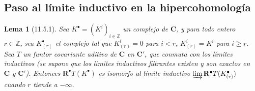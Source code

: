 \documentclass[10pt,oneside,openany]{book}
\theoremstyle{egaenv}\newtheorem*{env}{---}
\theoremstyle{egastatement}
\newtheorem*{lemma}{Lema}
\theoremstyle{egadescription}
\newcommand{\oldpage}[2][]{\marginnote{\normalfont\scriptsize\textbf{#1}\,|\,#2}\ignorespaces}
\renewcommand{\geq}{\geqslant}
\begin{document}
\subsection{Paso al límite inductivo en la hipercohomología}
\label{subsection:0.11.5}
\label{subsection:0.11.5-fr}

\begin{lemma}[11.5.1]
\label{0.11.5.1-fr}
Sea $K^\bullet=(K^i)_{i\in\mathbb Z}$ un complejo de $\boldsymbol{C}$, y para todo entero $r\in\mathbb Z$, sea $K_{(r)}^\bullet$ el complejo tal que $K_{(r)}^i=0$ para $i<r$, $K_{(r)}^i=K^i$ para $i\geq r$. Sea $T$ un funtor covariante aditivo
\oldpage[0\textsubscript{III}]{36}
de $\boldsymbol{C}$ en $\boldsymbol{C}'$, que conmuta con los límites inductivos (se supone que los límites inductivos filtrantes existen y son exactos en $\boldsymbol{C}$ y $\boldsymbol{C}'$). Entonces $\mathbf R^\bullet T(K^\bullet)$ es isomorfo al límite inductivo $\varinjlim\mathbf R^\bullet T(K_{(r)}^\bullet)$ cuando $r$ tiende a $-\infty$.
\end{lemma}
\end{document}
